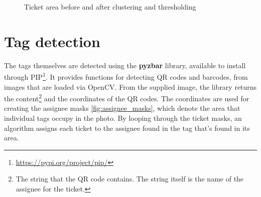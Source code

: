\documentclass[12pt]{report}
\theoremstyle{definition}
\theoremstyle{remark}
\begin{document}
\begin{figure}[h]%
    \centering
    \qquad
    \caption{Ticket area before and after clustering and thresholding}%
    \label{fig:digit_thresholding}%
\end{figure}

\section{Tag detection}
The tags themselves are detected using the \textbf{pyzbar} library, available to install through PIP\footnote{\url{https://pypi.org/project/pip/}}. It provides functions for detecting QR codes and barcodes, from images that are loaded via OpenCV. From the supplied image, the library returns the content\footnote{The string that the QR code contains. The string itself is the name of the assignee for the ticket.} and the coordinates of the QR codes. The coordinates are used for creating the assignee masks \ref{fig:assignee_masks}, which denote the area that individual tags occupy in the photo. By looping through the ticket masks, an algorithm assigns each ticket to the assignee found in the tag that's found in its area.
\end{document}
